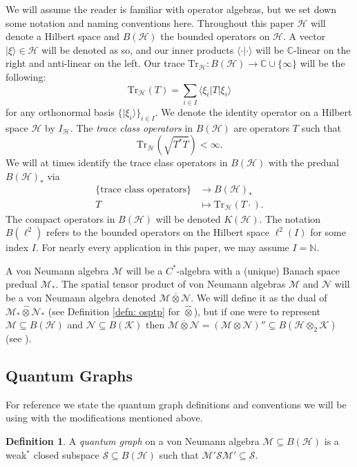\documentclass[12pt]{article}
\theoremstyle{definition}
\newtheorem{definition}[theorem]{Definition}
\newcommand{\N}{\mathbb N}
\newcommand{\C}{\mathbb C}
\newcommand{\mc}[1]{\mathcal{#1}}
\newcommand{\<}{\langle}
\renewcommand{\>}{\rangle}
\renewcommand{\hat}[1]{\widehat{#1}}
\renewcommand{\subset}{\subseteq}
\newcommand{\Tr}{\text{Tr}}
\renewcommand{\bar}[1]{\overline{#1}}
\begin{document}
We will assume the reader is familiar with operator algebras, but we set down some notation and naming conventions here. Throughout this paper $\mathcal H$ will denote a Hilbert space and $B(\mathcal H)$ the bounded operators on $\mc H$. A vector $|\xi\rangle \in \mc H$ will be denoted as so, and our inner products $\langle \cdot |\cdot \rangle$ will be $\C$-linear on the right and anti-linear on the left. Our trace $\Tr_{\mc H}: B(\mc H) \to \C \cup \{\infty\}$ will be the following:
\[
\Tr_{\mathcal H} (T) = \sum_{i \in I}\<\xi_i | T|\xi_i\>
\]
for any orthonormal basis $\{|\xi_i\>\}_{i \in I}$. We denote the identity operator on a Hilbert space $\mc H$ by $I_{\mc H}$.  The \textit{trace class operators} in $B(\mc H)$ are operators $T$ such that 
\[
\Tr_{\mc H} (\sqrt{T^*T}) < \infty.
\]
We will at times identify the trace class operators in $B(\mc H)$ with the predual $B(\mc H)_*$ via 
\begin{align*}
    \{\text{trace class operators}\} &\to B(\mc H)_* \\
    T &\mapsto \Tr_{\mc H}(T \cdot).
\end{align*}
The compact operators in $B(\mc H)$ will be denoted $K(\mc H)$. The notation $B(\ell^2)$ refers to the bounded operators on the Hilbert space $\ell^2(I)$ for some index $I$. For nearly every application in this paper, we may assume $I=\N$.

A von Neumann algebra $\mc M$ will be a $C^*$-algebra with a (unique) Banach space predual $\mc M_*$. The spatial tensor product of von Neumann algebras $\mc M$ and $\mc N$ will be a von Neumann algebra denoted $\mc M \overline{\otimes} \mc N$. We will define it as the dual of $\mc M_* \hat \otimes \mc N_*$ (see Definition \ref{defn: osptp} for $\hat \otimes$), but if one were to represent $\mc M \subset B(\mc H)$ and $\mc N \subset B(\mc K)$ then $\mc M \bar \otimes \mc N = (\mc M \otimes \mc N)'' \subset B(\mc H \otimes_2 \mc K)$ (see \cite[Definition 5.1]{takesaki1}). 

\subsection{Quantum Graphs}

For reference we state the quantum graph definitions and conventions we will be using with the modifications mentioned above.

\begin{definition}  \label{defn: qgraph}
A \textit{quantum graph} on a von Neumann algebra $\mc M \subset B(\mc H)$ is a weak$^*$ closed subspace $\mc S \subseteq B(\mc H)$ such that $\mc M' \mc S \mc M' \subset \mc S$.
\end{definition}
\end{document}
